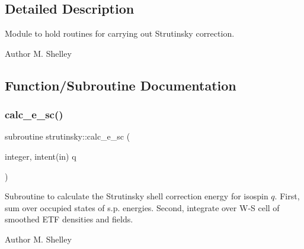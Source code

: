 \subsection{Detailed Description}
Module to hold routines for carrying out Strutinsky correction. 

\begin{DoxyAuthor}{Author}
M. Shelley 
\end{DoxyAuthor}


\subsection{Function/\+Subroutine Documentation}
\mbox{\label{namespacestrutinsky_a7a348b225e6556c53687ee28ee31b316}} 
\subsubsection{\texorpdfstring{calc\+\_\+e\+\_\+sc()}{calc\_e\_sc()}}
{\footnotesize\ttfamily subroutine strutinsky\+::calc\+\_\+e\+\_\+sc (\begin{DoxyParamCaption}\item[{integer, intent(in)}]{q }\end{DoxyParamCaption})}



Subroutine to calculate the Strutinsky shell correction energy for isospin $q$. First, sum over occupied states of s.\+p. energies. Second, integrate over W-\/S cell of smoothed E\+TF densities and fields. 

\begin{DoxyAuthor}{Author}
M. Shelley 
\end{DoxyAuthor}

